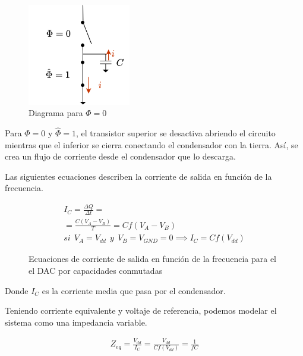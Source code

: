 \documentclass[12pt]{report} %
\begin{document}
	\begin{figure}[H]
		\includegraphics[width=0.4\textwidth]{sw-capacities-symbol-3.png}
		\caption[Diagrama para $\Phi=0$]{Diagrama para $\Phi=0$}
		\label{fig:sw-capacities-symbol-3.png}
	\end{figure}
	Para $\Phi = 0$ y $\hat{\Phi} = 1$, el transistor superior se desactiva abriendo el circuito mientras que el inferior se cierra conectando el condensador con la tierra. Así, se crea un flujo de corriente desde el condensador que lo descarga.
	
	Las siguientes ecuaciones describen la corriente de salida en función de la frecuencia.
	
	\begin{figure}[H]
		\caption{Ecuaciones de corriente de salida en función de la frecuencia para el el DAC por capacidades conmutadas}
		\label{sw-capacities-eqs}
		\begin{equation}
		\begin{array}{c}
		I_C = \frac{\Delta Q}{\Delta t} = \\
		= \frac{C(V_{A}-V_{B})}{T} = Cf(V_{A}-V_{B}) \\
		si\ \ V_{A} = V_{dd}\ \ y\ \ V_{B} = V_{GND} = 0 \implies I_C = Cf(V_{dd})
		\end{array}
		\end{equation}
	\end{figure}
	
	Donde $I_C$ es la corriente media que pasa por el condensador.
	
	Teniendo corriente equivalente y voltaje de referencia, podemos modelar el sistema como una impedancia variable.
	
	\begin{figure}[H]
		\label{sw-capacities-var-res}
		\begin{equation}
		\begin{array}{c}
		Z_{eq} = \frac{V_{dd}}{I_C} = \frac{V_{dd}}{Cf(V_{dd})} = \frac{1}{fC} \\
		\end{array}
		\end{equation}
	\end{figure}
	
\end{document}
